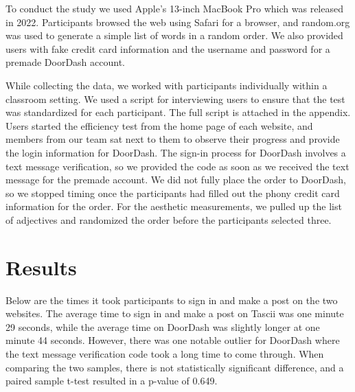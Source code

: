 To conduct the study we used Apple’s 13-inch MacBook Pro which was released in 2022. Participants browsed the web using Safari for a browser, and random.org was used to generate a simple list of words in a random order. We also provided users with fake credit card information and the username and password for a premade DoorDash account.

While collecting the data, we worked with participants individually within a classroom setting. We used a script for interviewing users to ensure that the test was standardized for each participant. The full script is attached in the appendix. Users started the efficiency test from the home page of each website, and members from our team sat next to them to observe their progress and provide the login information for DoorDash. The sign-in process for DoorDash involves a text message verification, so we provided the code as soon as we received the text message for the premade account. We did not fully place the order to DoorDash, so we stopped timing once the participants had filled out the phony credit card information for the order. For the aesthetic measurements, we pulled up the list of adjectives and randomized the order before the participants selected three.


\section{Results}

Below are the times it took participants to sign in and make a post on the two websites. The average time to sign in and make a post on Tascii was one minute 29 seconds, while the average time on DoorDash was slightly longer at one minute 44 seconds. However, there was one notable outlier for DoorDash where the text message verification code took a long time to come through. When comparing the two samples, there is not statistically significant difference, and a paired sample t-test resulted in a p-value of 0.649. 

